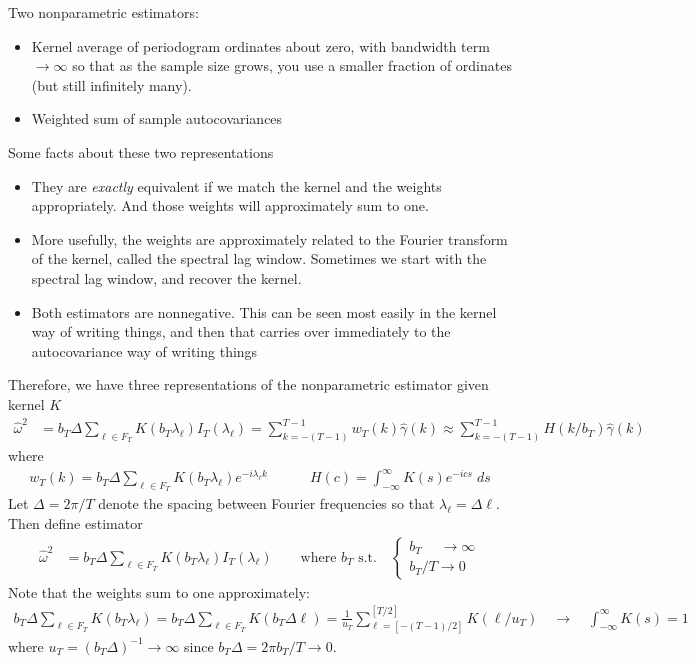 \documentclass[12pt]{article}
\theoremstyle{plain}
\theoremstyle{definition}
\theoremstyle{remark}
\newcommand{\ra}{\rightarrow}
\begin{document}
\clearpage
Two nonparametric estimators:
\begin{itemize}
  \item Kernel average of periodogram ordinates about zero, with
    bandwidth term $\ra\infty$ so that as the sample size grows, you use
    a smaller fraction of ordinates (but still infinitely many).
  \item Weighted sum of sample autocovariances
\end{itemize}
Some facts about these two representations
\begin{itemize}
  \item They are \emph{exactly} equivalent if we match the kernel and
    the weights appropriately.
    And those weights will approximately sum to one.
  \item More usefully, the weights are approximately related to the
    Fourier transform of the kernel, called the spectral lag window.
    Sometimes we start with the spectral lag window, and recover the
    kernel.
  \item Both estimators are nonnegative. This can be seen most easily in
    the kernel way of writing things, and then that carries over
    immediately to the autocovariance way of writing things
\end{itemize}
Therefore, we have three representations of the nonparametric estimator
given kernel $K$
\begin{align*}
  \hat{\omega}^2
  &=
  b_T
  \Delta
  \sum_{\ell \in F_T}
  K(b_T\lambda_\ell)
  I_T(\lambda_\ell)
  =
  \sum_{k=-(T-1)}^{T-1}
  w_T(k)
  \hat{\gamma}(k)
  \approx
  \sum_{k=-(T-1)}^{T-1}
  H(k/b_T)
  \hat{\gamma}(k)
\end{align*}
where
\begin{align*}
  w_T(k)
  =
  b_T
  \Delta
  \sum_{\ell\in F_T}
  K(b_T\lambda_\ell)
  e^{-i\lambda_\ell k}
  \quad\qquad
  H(c) =
  \int_{-\infty}^\infty
  K(s)
  e^{-ics}
  \;ds
\end{align*}
Let $\Delta = 2\pi/T$ denote the spacing between Fourier frequencies so
that $\lambda_\ell=\Delta \ell$.
Then define estimator
\begin{align*}
  \hat{\omega}^2
  &=
  b_T
  \Delta
  \sum_{\ell \in F_T}
  K(b_T\lambda_\ell)
  I_T(\lambda_\ell)
  \qquad\text{where $b_T$ s.t.}\quad
  \begin{cases}
    b_T \;\quad\ra\infty \\
    b_T/T \ra0
  \end{cases}
\end{align*}
Note that the weights sum to one approximately:
\begin{align*}
  b_T
  \Delta
  \sum_{\ell\in F_T}
  K(b_T\lambda_\ell)
  =
  b_T\Delta
  \sum_{\ell\in F_T}
  K\left(
    b_T\Delta
    \ell
  \right)
  =
  \frac{1}{u_T}
  \sum_{\ell=[-(T-1)/2]}^{[T/2]}
  K(\ell/u_T)
  \quad
  \ra
  \quad
  \int_{-\infty}^\infty K(s)
  =1
\end{align*}
where $u_T=(b_T\Delta)^{-1}\ra\infty$ since
$b_T\Delta = 2\pi b_T/T\ra 0$.
\end{document}

